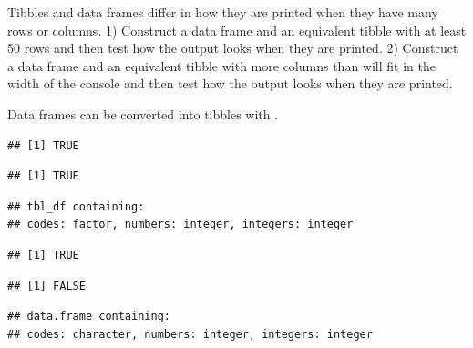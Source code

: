 \documentclass[krantz2]{krantz}\usepackage{knitr}
\begin{document}
\begin{playground}
Tibbles and data frames differ in how they are printed when they have many rows or columns. 1) Construct a data frame and an equivalent tibble with at least 50 rows and then test how the output looks when they are printed. 2) Construct a data frame and an equivalent tibble with more columns than will fit in the width of the \R console and then test how the output looks when they are printed.
\end{playground}

Data frames can be converted into tibbles with .

\begin{knitrout}\footnotesize
{}\color{fgcolor}\begin{kframe}
\begin{alltt}
 \hlkwb{<-} 
\end{alltt}
\begin{verbatim}
## [1] TRUE
\end{verbatim}
\begin{alltt}
\end{alltt}
\begin{verbatim}
## [1] TRUE
\end{verbatim}
\begin{alltt}
\end{alltt}
\begin{verbatim}
## tbl_df containing:
## codes: factor, numbers: integer, integers: integer
\end{verbatim}
\end{kframe}
\end{knitrout}

\begin{knitrout}\footnotesize
{}\color{fgcolor}\begin{kframe}
\begin{alltt}
 \hlkwb{<-} 
\end{alltt}
\begin{verbatim}
## [1] TRUE
\end{verbatim}
\begin{alltt}
\end{alltt}
\begin{verbatim}
## [1] FALSE
\end{verbatim}
\begin{alltt}
\end{alltt}
\begin{verbatim}
## data.frame containing:
## codes: character, numbers: integer, integers: integer
\end{verbatim}
\end{kframe}
\end{knitrout}
\end{document}
